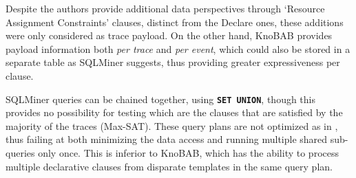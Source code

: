 {Despite the authors } provide additional {data} perspectives through `Resource Assignment Constraints' clauses, distinct from the Declare ones, these additions were only considered  {as trace payload}. On the other hand, KnoBAB provides payload information {both \emph{per trace}} and \emph{per event}, which could also be stored in a separate table as SQLMiner suggests, thus providing greater expressiveness per clause.

SQLMiner queries can be chained together, using \texttt{\textbf{SET UNION}}, though this provides no possibility for testing which are the clauses that are satisfied by the majority of the traces (Max-SAT). These query plans are not optimized as in \cite{BellatrecheKB21}, thus failing at both minimizing the data access
and running multiple shared sub-queries only once.
This is inferior to KnoBAB, which has the ability to process multiple 
declarative clauses from disparate templates in the same query plan.
